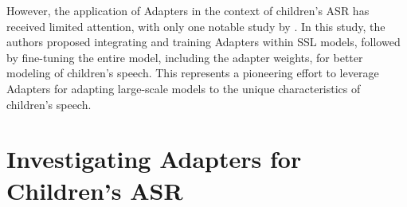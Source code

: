 However, the application of Adapters in the context of children's ASR has received limited attention, with only one notable study by \cite{fan2022draft}. In this study, the authors proposed integrating and training Adapters within SSL models, followed by fine-tuning the entire model, including the adapter weights, for better modeling of children's speech. This represents a pioneering effort to leverage Adapters for adapting large-scale models to the unique characteristics of children's speech.

\section{Investigating Adapters for Children's ASR}

